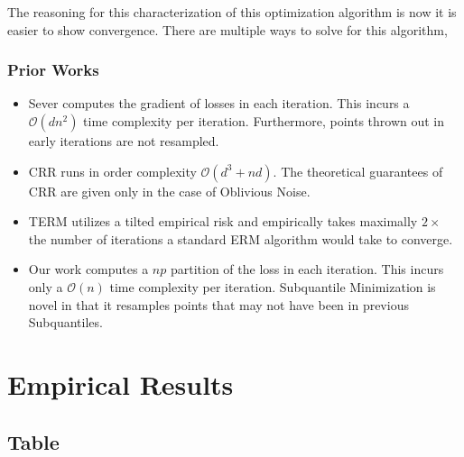 \documentclass[
11pt, %
serif
]{beamer}
\begin{document}
	\begin{frame}
		The reasoning for this characterization of this optimization algorithm is now it is easier to show convergence. There are multiple ways to solve for this algorithm, 
	\end{frame}
	
	\begin{frame}
		\frametitle{Prior Works }
		\begin{itemize}
			\item[\ding{228}]
			\cite{DiakonikolasKKLSS19} Sever computes the gradient of losses in each iteration. This incurs a $\mathcal{O}(dn^2)$ time complexity per iteration. Furthermore, points thrown out in early iterations are not resampled. 
			\item[\ding{228}]
			\cite{bhatia2017} CRR runs in order complexity $\mathcal{O}(d^3 + nd)$. The theoretical guarantees of CRR are given only in the case of Oblivious Noise.
			\item[\ding{228}]
			\cite{li2020tilted} TERM utilizes a tilted empirical risk and empirically takes maximally $2 \times$ the number of iterations a standard ERM algorithm would take to converge.
			\item[\ding{228}] 
			Our work computes a $np$ partition of the loss in each iteration. This incurs only a $\mathcal{O}(n)$ time complexity per iteration. Subquantile Minimization is novel in that it resamples points that may not have been in previous Subquantiles.
		\end{itemize}
		
	\end{frame}	
	
	
	\section{Empirical Results}
	
	\subsection{Table}
	
\end{document}
